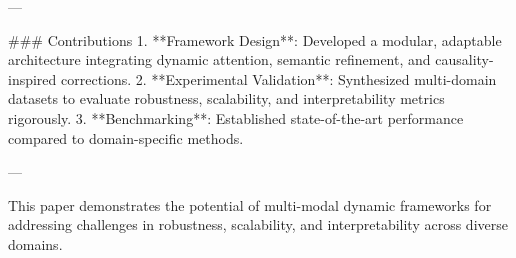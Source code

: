 ---

### Contributions  
1. **Framework Design**: Developed a modular, adaptable architecture integrating dynamic attention, semantic refinement, and causality-inspired corrections.  
2. **Experimental Validation**: Synthesized multi-domain datasets to evaluate robustness, scalability, and interpretability metrics rigorously.  
3. **Benchmarking**: Established state-of-the-art performance compared to domain-specific methods.  

--- 

This paper demonstrates the potential of multi-modal dynamic frameworks for addressing challenges in robustness, scalability, and interpretability across diverse domains.